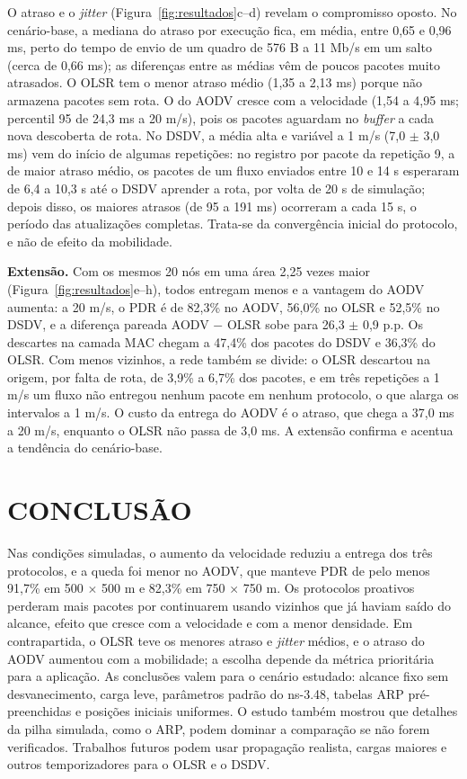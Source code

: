 \documentclass[12pt]{article}
\begin{document}
O atraso e o \textit{jitter} (Figura~\ref{fig:resultados}c--d) revelam o compromisso oposto. No cenário-base, a mediana do atraso por execução fica, em média, entre 0,65 e 0,96 ms, perto do tempo de envio de um quadro de 576 B a 11 Mb/s em um salto (cerca de 0,66 ms); as diferenças entre as médias vêm de poucos pacotes muito atrasados. O OLSR tem o menor atraso médio (1,35 a 2,13 ms) porque não armazena pacotes sem rota. O do AODV cresce com a velocidade (1,54 a 4,95 ms; percentil 95 de 24,3 ms a 20 m/s), pois os pacotes aguardam no \textit{buffer} a cada nova descoberta de rota. No DSDV, a média alta e variável a 1 m/s (7,0 $\pm$ 3,0 ms) vem do início de algumas repetições: no registro por pacote da repetição 9, a de maior atraso médio, os pacotes de um fluxo enviados entre 10 e 14 s esperaram de 6,4 a 10,3 s até o DSDV aprender a rota, por volta de 20 s de simulação; depois disso, os maiores atrasos (de 95 a 191 ms) ocorreram a cada 15 s, o período das atualizações completas. Trata-se da convergência inicial do protocolo, e não de efeito da mobilidade.

\textbf{Extensão.} Com os mesmos 20 nós em uma área 2,25 vezes maior (Figura~\ref{fig:resultados}e--h), todos entregam menos e a vantagem do AODV aumenta: a 20 m/s, o PDR é de 82,3\% no AODV, 56,0\% no OLSR e 52,5\% no DSDV, e a diferença pareada AODV $-$ OLSR sobe para 26,3 $\pm$ 0,9 p.p. Os descartes na camada MAC chegam a 47,4\% dos pacotes do DSDV e 36,3\% do OLSR. Com menos vizinhos, a rede também se divide: o OLSR descartou na origem, por falta de rota, de 3,9\% a 6,7\% dos pacotes, e em três repetições a 1 m/s um fluxo não entregou nenhum pacote em nenhum protocolo, o que alarga os intervalos a 1 m/s. O custo da entrega do AODV é o atraso, que chega a 37,0 ms a 20 m/s, enquanto o OLSR não passa de 3,0 ms. A extensão confirma e acentua a tendência do cenário-base.

\section{CONCLUSÃO}

Nas condições simuladas, o aumento da velocidade reduziu a entrega dos três protocolos, e a queda foi menor no AODV, que manteve PDR de pelo menos 91,7\% em 500 $\times$ 500 m e 82,3\% em 750 $\times$ 750 m. Os protocolos proativos perderam mais pacotes por continuarem usando vizinhos que já haviam saído do alcance, efeito que cresce com a velocidade e com a menor densidade. Em contrapartida, o OLSR teve os menores atraso e \textit{jitter} médios, e o atraso do AODV aumentou com a mobilidade; a escolha depende da métrica prioritária para a aplicação. As conclusões valem para o cenário estudado: alcance fixo sem desvanecimento, carga leve, parâmetros padrão do ns-3.48, tabelas ARP pré-preenchidas e posições iniciais uniformes. O estudo também mostrou que detalhes da pilha simulada, como o ARP, podem dominar a comparação se não forem verificados. Trabalhos futuros podem usar propagação realista, cargas maiores e outros temporizadores para o OLSR e o DSDV.


\end{document}
